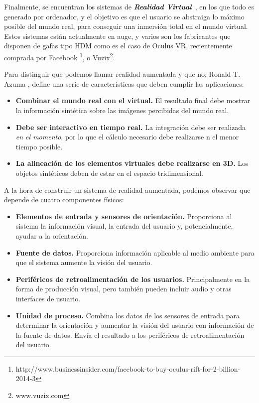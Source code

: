 Finalmente, se encuentran los sistemas de \textbf{\textit{Realidad Virtual}}~\cite{steuer1992defining}, en los que todo es generado por ordenador, y el objetivo es que el usuario se abstraiga lo máximo posible del mundo real, para conseguir una inmersión total en el mundo virtual. Estos sistemas están actualmente en auge, y varios son los fabricantes que disponen de gafas tipo \acs{HDM} como es el caso de Oculus VR, recientemente comprada por Facebook
\footnote{http://www.businessinsider.com/facebook-to-buy-oculus-rift-for-2-billion-2014-3}, o Vuzix\footnote{www.vuzix.com}.


Para distinguir que podemos llamar realidad aumentada y que no, Ronald T. Azuma \cite{Azuma}, define una serie de características que deben cumplir las aplicaciones:
\begin{itemize}
\item \textbf{Combinar el mundo real con el virtual.} El resultado final debe mostrar la información sintética sobre las imágenes percibidas del mundo real.
\item \textbf{Debe ser interactivo en tiempo real.} La integración debe ser realizada \emph{en el momento}, por lo que el cálculo necesario debe realizarse n el menor tiempo posible.
\item \textbf{La alineación de los elementos virtuales debe realizarse en 3D.} Los objetos sintéticos deben de estar en el espacio tridimensional.
\end{itemize}

A la hora de construir un sistema de realidad aumentada, podemos observar que depende de cuatro componentes físicos:

\begin{itemize}
\item \textbf{Elementos de entrada y sensores de orientación.} Proporciona al sistema la información visual, la entrada del usuario y, potencialmente, ayudar a la orientación.
\item \textbf{Fuente de datos.} Proporciona información aplicable al medio ambiente para que el sistema aumente la visión del usuario.
\item \textbf{Periféricos de retroalimentación de los usuarios.} Principalmente en la forma de producción visual, pero también pueden incluir audio y otras interfaces de usuario.
\item \textbf{Unidad de proceso.} Combina los datos de los sensores de entrada para determinar la orientación y aumentar la visión del usuario con información de la fuente de datos. Envía el resultado a los periféricos de retroalimentación del usuario.
\end{itemize}

